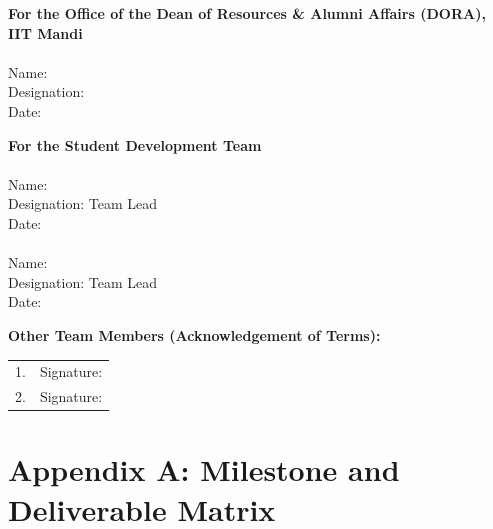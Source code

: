 \documentclass[11pt]{article}
\begin{document}
\vspace{1cm}
\begin{minipage}[t]{0.48\textwidth}
\textbf{For the Office of the Dean of Resources \& Alumni Affairs (DORA), IIT Mandi}\\[1.4cm]
\underline{\hspace{6.5cm}}\\
Name:\underline{\hspace{5cm}}\\[6pt]
Designation:\underline{\hspace{4.5cm}}\\[6pt]
Date:\underline{\hspace{5.5cm}}
\end{minipage}
\hfill
\begin{minipage}[t]{0.48\textwidth}
\textbf{For the Student Development Team}\\[6pt]
\underline{\hspace{6.5cm}}\\
Name:\underline{\hspace{5cm}}\\
Designation: Team Lead\\
Date:\underline{\hspace{5.5cm}}\\[10pt]
\underline{\hspace{6.5cm}}\\
Name:\underline{\hspace{5cm}}\\
Designation: Team Lead\\
Date:\underline{\hspace{5.5cm}}
\end{minipage}

\vspace{1cm}
\textbf{Other Team Members (Acknowledgement of Terms):}

\begin{tabular}{@{}p{7.5cm}p{6cm}@{}}
1. \underline{\hspace{6cm}} & Signature: \underline{\hspace{3.5cm}} \\[10pt]
2. \underline{\hspace{6cm}} & Signature: \underline{\hspace{3.5cm}} \\
\end{tabular}

\clearpage
\appendix
\section{Appendix A: Milestone and Deliverable Matrix}
\end{document}
